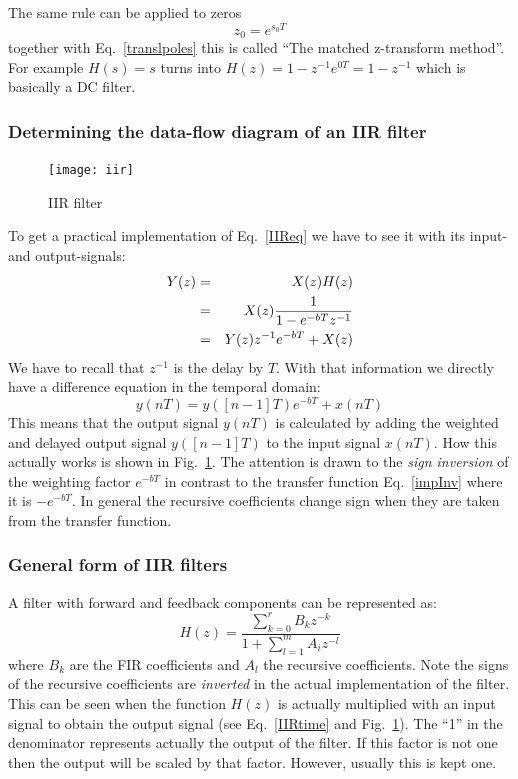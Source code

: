 \documentclass[12pt,a4paper]{article}
\begin{document}
The same rule can be applied to zeros
\begin{equation}
z_0=e^{s_0 T} \label{matchedz}
\label{transzeros}
\end{equation}
together with Eq.~\ref{translpoles} this is called ``The matched
z-transform method''. For example $H(s)=s$ turns into
$H(z)=1-z^{-1}e^{0T}=1-z^{-1}$ which is basically a DC filter.


\subsubsection{Determining the data-flow diagram of an IIR filter}
\begin{figure}[!hbt]
\begin{center}
\mbox{\texttt{[image: iir]}}
\caption{IIR filter \label{IIRfilter}}
\end{center}
\end{figure}
To get a practical implementation of Eq.~\ref{IIReq} we have
to see it with its input- and output-signals:
\begin{eqnarray}
Y(z)&=&X(z)H(z)\\
    &=&X(z) {1\over 1-e^{-bT} z^{-1}} \\
    &=&Y(z)z^{-1}e^{-bT}+X(z)
\label{Verg}
\end{eqnarray}
We have to recall that $z^{-1}$ is the delay by $T$. With that
information we directly have a difference equation in the
temporal domain:
\begin{equation}
y(nT)=y([n-1]T) e^{-bT} + x(nT)
\label{IIRtime}
\end{equation}
This means that the output signal $y(nT)$ is calculated by
adding the weighted and delayed output signal $y([n-1]T)$ 
to the input signal $x(nT)$.
How this actually works is shown in Fig.~\ref{IIRfilter}.
The attention is drawn to the \textsl{sign inversion} of the weighting
factor $e^{-bT}$ in contrast to the transfer function 
Eq.~\ref{impInv} where it is $-e^{-bT}$. In general the recursive
coefficients change sign when they are taken from the transfer
function.



\subsubsection{General form of IIR filters}
A filter with forward and feedback components can be represented as:
\begin{equation} 
H(z) = \frac{\sum_{k = 0}^{r} B_{k} z^{-k}}{1 + \sum_{l = 1}^{m} A_{i} z^{-l}} \end{equation}
where $B_k$ are the FIR coefficients and $A_l$ the recursive coefficients.
Note the signs of the recursive coefficients are \textsl{inverted} in the
actual implementation of the filter. This can be seen when the
function $H(z)$ is actually multiplied with an input signal to
obtain the output signal (see Eq.~\ref{IIRtime} and Fig.~\ref{IIRfilter}).
The ``1'' in the denominator represents actually the output of
the filter. If this factor is not one then the output will be scaled
by that factor. However, usually this is kept one.
\end{document}
